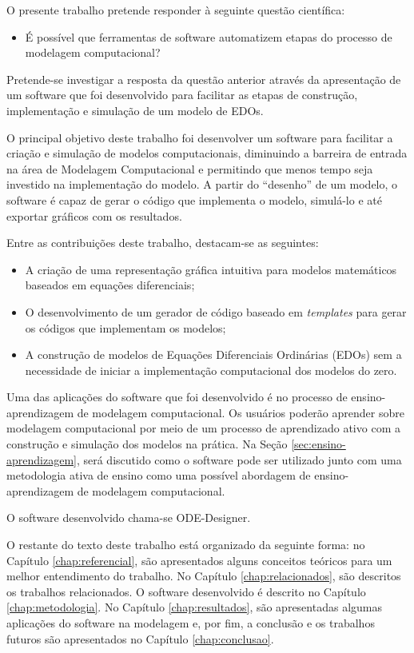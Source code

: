 \documentclass[
	12pt,				%
	openright,			%
	oneside,			%
	a4paper,			%
	main=brazil,
	english,			%
	]{ufsj-abntex2}
\begin{document}
O presente trabalho pretende responder à seguinte questão científica: 
\begin{itemize}
    \item É possível que ferramentas de software automatizem etapas do processo de modelagem computacional?  
\end{itemize}

Pretende-se investigar a resposta da questão anterior através da apresentação de um software que foi desenvolvido para facilitar as etapas de construção, implementação e simulação de um modelo de EDOs. 

O principal objetivo deste trabalho foi desenvolver um software para facilitar a criação e simulação de modelos computacionais, diminuindo a barreira de entrada na área de Modelagem Computacional e permitindo que menos tempo seja investido na implementação do modelo. A partir do ``desenho'' de um modelo, o software é capaz de gerar o código que implementa o modelo, simulá-lo e até exportar gráficos com os resultados.

Entre as contribuições deste trabalho, destacam-se as seguintes: 

\begin{itemize}
    \item A criação de uma representação gráfica intuitiva para modelos matemáticos baseados em equações diferenciais; 
    \item O desenvolvimento de um gerador de código baseado em \textit{templates} para gerar os códigos que implementam os modelos; 
    \item A construção de modelos de Equações Diferenciais Ordinárias (EDOs) sem a necessidade de iniciar a implementação computacional dos modelos do zero.
\end{itemize}

Uma das aplicações do software que foi desenvolvido é no processo de ensino-aprendizagem de modelagem computacional. Os usuários poderão aprender sobre modelagem computacional por meio de um processo de aprendizado ativo com a construção e simulação dos modelos na prática. Na Seção \ref{sec:ensino-aprendizagem}, será discutido como o software pode ser utilizado junto com uma metodologia ativa de ensino como uma possível abordagem de ensino-aprendizagem de modelagem computacional.  

O software desenvolvido chama-se ODE-Designer.

O restante do texto deste trabalho está organizado da seguinte forma: no Capítulo \ref{chap:referencial}, são apresentados alguns conceitos teóricos para um melhor entendimento do trabalho. No Capítulo \ref{chap:relacionados}, são descritos os trabalhos relacionados. O software desenvolvido é descrito no Capítulo \ref{chap:metodologia}. No Capítulo \ref{chap:resultados}, são apresentadas algumas aplicações do software na modelagem e, por fim, a conclusão e os trabalhos futuros são apresentados no Capítulo \ref{chap:conclusao}. 
\end{document}
